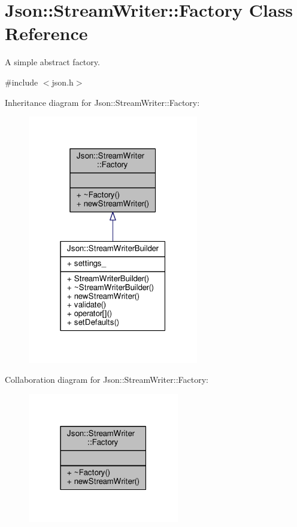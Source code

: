 \hypertarget{classJson_1_1StreamWriter_1_1Factory}{}\section{Json\+:\+:Stream\+Writer\+:\+:Factory Class Reference}
\label{classJson_1_1StreamWriter_1_1Factory}


A simple abstract factory.  




{\ttfamily \#include $<$json.\+h$>$}



Inheritance diagram for Json\+:\+:Stream\+Writer\+:\+:Factory\+:
\nopagebreak
\begin{figure}[H]
\begin{center}
\leavevmode
\includegraphics[width=211pt]{da/dbc/classJson_1_1StreamWriter_1_1Factory__inherit__graph}
\end{center}
\end{figure}


Collaboration diagram for Json\+:\+:Stream\+Writer\+:\+:Factory\+:
\nopagebreak
\begin{figure}[H]
\begin{center}
\leavevmode
\includegraphics[width=187pt]{df/dc0/classJson_1_1StreamWriter_1_1Factory__coll__graph}
\end{center}
\end{figure}
